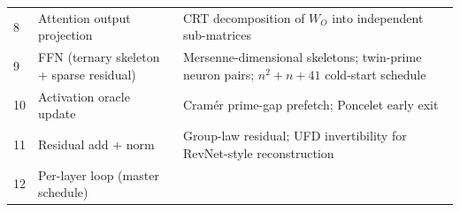\documentclass[
  11pt,
]{article}
\begin{document}
\begin{longtable}[]{@{}lll@{}}
\begin{minipage}[t]{0.08\columnwidth}
8\strut
\end{minipage} & \begin{minipage}[t]{0.17\columnwidth}\raggedright
Attention output projection\strut
\end{minipage} & \begin{minipage}[t]{0.66\columnwidth}\raggedright
CRT decomposition of \(W_O\) into independent sub-matrices\strut
\end{minipage}\tabularnewline
\begin{minipage}[t]{0.08\columnwidth}\raggedright
9\strut
\end{minipage} & \begin{minipage}[t]{0.17\columnwidth}\raggedright
FFN (ternary skeleton + sparse residual)\strut
\end{minipage} & \begin{minipage}[t]{0.66\columnwidth}\raggedright
Mersenne-dimensional skeletons; twin-prime neuron pairs;
\(n^2{+}n{+}41\) cold-start schedule\strut
\end{minipage}\tabularnewline
\begin{minipage}[t]{0.08\columnwidth}\raggedright
10\strut
\end{minipage} & \begin{minipage}[t]{0.17\columnwidth}\raggedright
Activation oracle update\strut
\end{minipage} & \begin{minipage}[t]{0.66\columnwidth}\raggedright
Cramér prime-gap prefetch; Poncelet early exit\strut
\end{minipage}\tabularnewline
\begin{minipage}[t]{0.08\columnwidth}\raggedright
11\strut
\end{minipage} & \begin{minipage}[t]{0.17\columnwidth}\raggedright
Residual add + norm\strut
\end{minipage} & \begin{minipage}[t]{0.66\columnwidth}\raggedright
Group-law residual; UFD invertibility for RevNet-style
reconstruction\strut
\end{minipage}\tabularnewline
\begin{minipage}[t]{0.08\columnwidth}\raggedright
12\strut
\end{minipage} & \begin{minipage}[t]{0.17\columnwidth}\raggedright
Per-layer loop (master schedule)\strut
\end{minipage} & \begin{minipage}[t]{0.66\columnwidth}\raggedright

\end{minipage}
\end{longtable}
\end{document}
